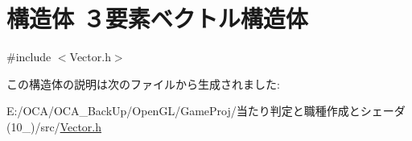 \hypertarget{struct_xEF_xBC_x93_xE8_xA6_x81_xE7_xB4_xA0_xE3_x83_x99_xE3_x82_xAF_xE3_x83_x88_xE3_x83_xAB_xE6_xA7_x8B_xE9_x80_xA0_xE4_xBD_x93}{\section{構造体 ３要素ベクトル構造体}
\label{struct_xEF_xBC_x93_xE8_xA6_x81_xE7_xB4_xA0_xE3_x83_x99_xE3_x82_xAF_xE3_x83_x88_xE3_x83_xAB_xE6_xA7_x8B_xE9_x80_xA0_xE4_xBD_x93}
}


{\ttfamily \#include $<$Vector.\-h$>$}



この構造体の説明は次のファイルから生成されました\-:\begin{DoxyCompactItemize}
\item 
E\-:/\-O\-C\-A/\-O\-C\-A\-\_\-\-Back\-Up/\-Open\-G\-L/\-Game\-Proj/当たり判定と職種作成とシェーダ(10\-\_)/src/\hyperlink{_vector_8h}{Vector.\-h}\end{DoxyCompactItemize}
